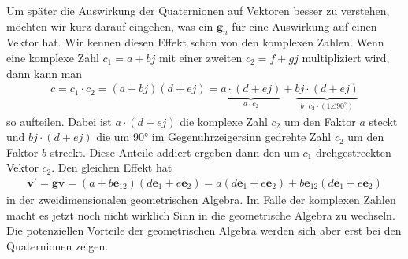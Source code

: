 Um später die Auswirkung der Quaternionen auf Vektoren besser zu verstehen, möchten wir kurz darauf eingehen, was ein  $\mathbf{g}_n$ für eine Auswirkung auf einen Vektor hat.
Wir kennen diesen Effekt schon von den komplexen Zahlen. Wenn eine komplexe Zahl $c_1=a+bj$ mit einer zweiten $c_2=f+gj$ multipliziert wird, dann kann man
\begin{align}
c = c_1\cdot c_2 = (a + bj)(d + ej) = \underbrace{a\cdot(d+ej)}_{\displaystyle{a\cdot c_2}} + \underbrace{bj\cdot(d+ej)}_{\displaystyle{b\cdot c_2 \cdot (1\angle 90^\circ)}}
\end{align}
so aufteilen. Dabei ist $a\cdot(d+ej)$ die komplexe Zahl $c_2$ um den Faktor $a$ steckt und $bj\cdot(d+ej)$ die um 90° im Gegenuhrzeigersinn gedrehte Zahl $c_2$ um den Faktor $b$ streckt. Diese Anteile addiert ergeben dann den um $c_1$ drehgestreckten Vektor $c_2$. Den gleichen Effekt hat
\begin{align}\label{GAdrehstreck}
\mathbf{v}' = \mathbf{g}\mathbf{v} = (a + b\mathbf{e}_{12})(d\mathbf{e}_{1} + e\mathbf{e}_{2}) = a(d\mathbf{e}_{1} + e\mathbf{e}_{2}) + b\mathbf{e}_{12}(d\mathbf{e}_{1} + e\mathbf{e}_{2})
\end{align}
in der zweidimensionalen geometrischen Algebra. Im Falle der komplexen Zahlen macht es jetzt noch nicht wirklich Sinn in die geometrische Algebra zu wechseln. Die potenziellen Vorteile der geometrischen Algebra werden sich aber erst bei den Quaternionen zeigen.